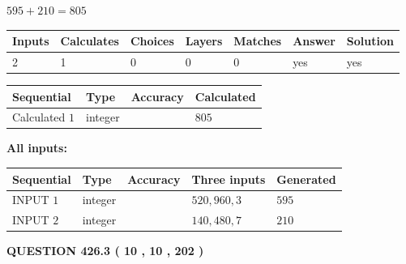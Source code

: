 \documentclass{ctexart}
\begin{document}
 

$ %
595 +  %
210=   %
805$
 
 
\noindent{}
 
 

 
   
   
   
   
\noindent\begin{tabular}{|l|l|l|l|l|l|l|}
 \hline
Inputs & Calculates & Choices & Layers & Matches & Answer & Solution \\ \hline
 2  & 
 1  & 
 0
  & 
 0  & 
 0  & 
  yes & 
  yes 
  \\ \hline
 \end{tabular}
   
   
   
   
\noindent{}
   
   
  
  
\noindent\begin{tabular}{|l|l|l|l|}
\hline
 Sequential & Type & Accuracy & Calculated \\ 
\hline
 
 
  Calculated $  1 $ & integer &  & 
  $ 805 $ 
 \\  \hline  
 \end{tabular}
   
   
   
   
\noindent\vspace{0.1in}\hspace{-0.08in} {\textbf{\Large{All inputs: }}}
   
   
  
  
\noindent\begin{tabular}{|l|l|l|l|l|}
\hline
 Sequential & Type & Accuracy & Three inputs & Generated \\ 
\hline
 
 
  INPUT $  1 $ & integer &  & $
 520
 , 
 960
 , 
 3
 $ & $ 595 $ 
 \\  \hline  
 
 
  INPUT $  2 $ & integer &  & $
 140
 , 
 480
 , 
 7
 $ & $ 210 $ 
 \\  \hline  
 \end{tabular}
   
   
  
\vspace{0.2in}
  
{\textbf{\Large{QUESTION
426.3 
 ( 10 , 10 , 202 )
}}}
  
\end{document}
